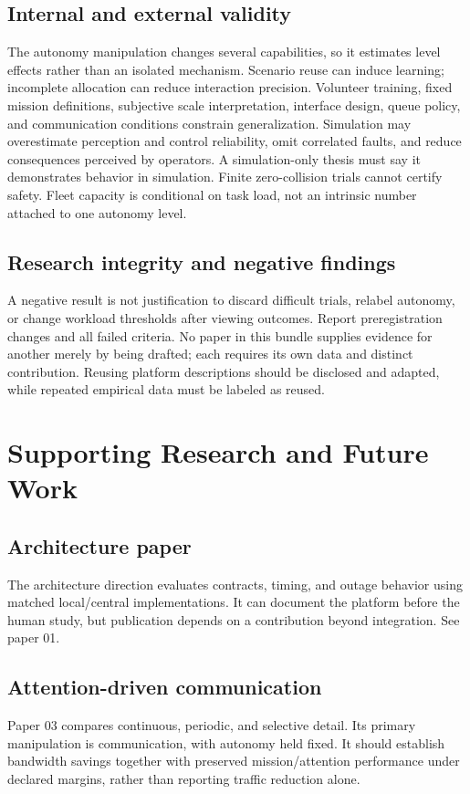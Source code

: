 \documentclass[12pt,oneside]{report}
\begin{document}
\section{Internal and external validity}
The autonomy manipulation changes several capabilities, so it estimates level effects rather than an isolated mechanism. Scenario reuse can induce learning; incomplete allocation can reduce interaction precision. Volunteer training, fixed mission definitions, subjective scale interpretation, interface design, queue policy, and communication conditions constrain generalization. Simulation may overestimate perception and control reliability, omit correlated faults, and reduce consequences perceived by operators. A simulation-only thesis must say it demonstrates behavior in simulation. Finite zero-collision trials cannot certify safety. Fleet capacity is conditional on task load, not an intrinsic number attached to one autonomy level.
\section{Research integrity and negative findings}
A negative result is not justification to discard difficult trials, relabel autonomy, or change workload thresholds after viewing outcomes. Report preregistration changes and all failed criteria. No paper in this bundle supplies evidence for another merely by being drafted; each requires its own data and distinct contribution. Reusing platform descriptions should be disclosed and adapted, while repeated empirical data must be labeled as reused.
\chapter{Supporting Research and Future Work}
\section{Architecture paper}
The architecture direction evaluates contracts, timing, and outage behavior using matched local/central implementations. It can document the platform before the human study, but publication depends on a contribution beyond integration. See paper 01.
\section{Attention-driven communication}
Paper 03 compares continuous, periodic, and selective detail. Its primary manipulation is communication, with autonomy held fixed. It should establish bandwidth savings together with preserved mission/attention performance under declared margins, rather than reporting traffic reduction alone.
\end{document}
